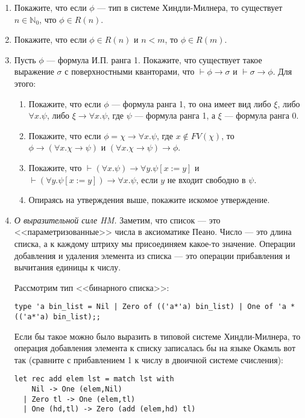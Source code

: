 \documentclass[10pt,a4paper,oneside]{article}
\begin{document}
\begin{enumerate}
\item Покажите, что если $\phi$ --- тип в системе Хиндли-Милнера,
то существует $n\in \mathbb{N}_0$, что $\phi\in R(n)$.

\item Покажите, что если $\phi\in R(n)$ и $n < m$, то $\phi\in R(m)$.

\item Пусть $\phi$ --- формула И.П. ранга 1. Покажите, что существует такое выражение $\sigma$ с поверхностными кванторами,
что $\vdash\phi\rightarrow\sigma$ и $\vdash\sigma\rightarrow\phi$. Для этого:
\begin{enumerate}
\item Покажите, что если $\phi$ --- формула ранга 1, то она имеет вид либо $\xi$, либо $\forall x.\psi$, 
либо $\xi\rightarrow\forall x.\psi$, где $\psi$ --- формула ранга 1, а $\xi$ --- формула ранга 0.
\item Покажите, что если $\phi = \chi\rightarrow\forall x.\psi$, где $x \notin FV(\chi)$, 
то $\phi\rightarrow(\forall x.\chi\rightarrow\psi)$ и $(\forall x.\chi\rightarrow\psi)\rightarrow\phi$.
\item Покажите, что $\vdash (\forall x.\psi)\rightarrow \forall y.\psi[x:=y]$ и $\vdash (\forall y.\psi[x:=y])\rightarrow\forall x.\psi$,
если $y$ не входит свободно в $\psi$.
\item Опираясь на утверждения выше, покажите искомое утверждение.
\end{enumerate}

\item \emph{О выразительной силе HM.} Заметим, что список --- это <<параметризованные>> числа в 
аксиоматике Пеано. Число --- это длина списка, а к каждому штриху мы присоединяем какое-то значение.
Операции добавления и удаления элемента из списка --- это операции прибавления и вычитания
единицы к числу.

Рассмотрим тип <<бинарного списка>>:

\begin{verbatim}
type 'a bin_list = Nil | Zero of (('a*'a) bin_list) | One of 'a * (('a*'a) bin_list);;
\end{verbatim}

Если бы такое можно было выразить в типовой системе Хиндли-Милнера, то операция добавления
элемента к списку записалась бы на языке Окамль вот так (сравните с прибавлением 1 к числу
в двоичной системе счисления):

\begin{verbatim}
let rec add elem lst = match lst with
    Nil -> One (elem,Nil)
  | Zero tl -> One (elem,tl)
  | One (hd,tl) -> Zero (add (elem,hd) tl)
\end{verbatim}


\end{enumerate}
\end{document}
